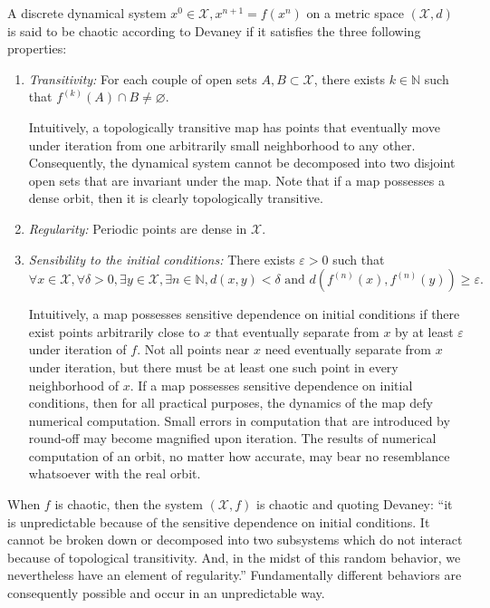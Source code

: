 \begin{definition}
\label{def:chaos}
A discrete dynamical system $x^0 \in \mathcal{X}, x^{n+1}=f(x^n)$ on a
metric space $(\mathcal{X},d)$ is said to be chaotic according to Devaney
if it satisfies the three following properties:
    \begin{enumerate}
\item \emph{Transitivity:} For each couple of open sets $A,B \subset \mathcal{X}$, there exists $k \in \mathbb{N}$ such that $f^{(k)}(A)\cap B \neq \varnothing$.

Intuitively, a topologically transitive map has points that eventually move under iteration from one arbitrarily small neighborhood to any other. Consequently, the dynamical system cannot be decomposed into two disjoint open sets that are invariant under the map. Note that if a map possesses a dense orbit, then it is clearly topologically transitive.
\item \emph{Regularity:} Periodic points are dense in $\mathcal{X}$.
\item \emph{Sensibility to the initial conditions:} There exists $\varepsilon>0$ such that $$\forall x \in \mathcal{X}, \forall \delta >0, \exists y \in \mathcal{X}, \exists n \in \mathbb{N}, d(x,y)<\delta \textrm{ and } d(f^{(n)}(x),f^{(n)}(y)) \geqslant \varepsilon.$$

Intuitively, a map possesses sensitive dependence on initial conditions if there exist points arbitrarily close to $x$ that eventually separate from $x$ by at least $\varepsilon$ under iteration of $f$. Not all points near $x$ need eventually separate from $x$ under iteration, but there must be at least one such point in every neighborhood of $x$. If a map possesses sensitive dependence on initial conditions, then for all practical purposes, the dynamics of the map defy numerical computation. Small errors in computation that are introduced by round-off may become magnified upon iteration. The results of numerical computation of an orbit, no matter how accurate, may bear no resemblance whatsoever with the real orbit.
\end{enumerate}
\end{definition}


When $f$ is chaotic, then the system $(\mathcal{X}, f)$ is chaotic and quoting Devaney: ``it is unpredictable because of the sensitive dependence on initial conditions. It cannot be broken down or decomposed into two subsystems which do not interact because of topological transitivity. And, in the midst of this random behavior, we nevertheless have an element of regularity.'' Fundamentally different behaviors are consequently possible and occur in an unpredictable way.




